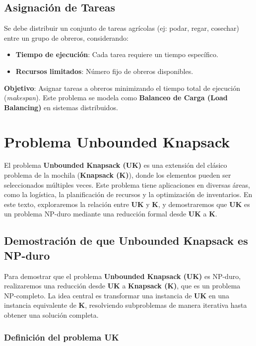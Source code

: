 \documentclass{report}
\begin{document}
	\section{Asignación de Tareas}
	Se debe distribuir un conjunto de tareas agrícolas (ej: podar, regar, cosechar) entre un grupo de obreros, considerando:
	\begin{itemize}
		\item \textbf{Tiempo de ejecución}: Cada tarea requiere un tiempo específico.
		\item \textbf{Recursos limitados}: Número fijo de obreros disponibles.
	\end{itemize}
	
	\textbf{Objetivo}: Asignar tareas a obreros minimizando el tiempo total de ejecución (\textit{makespan}). Este problema se modela como \textbf{Balanceo de Carga (Load Balancing)} en sistemas distribuidos.
	
	
	\chapter{Problema Unbounded Knapsack}
El problema \textbf{Unbounded Knapsack (UK)} es una extensión del clásico problema de la mochila (\textbf{Knapsack (K)}), donde los elementos pueden ser seleccionados múltiples veces. Este problema tiene aplicaciones en diversas áreas, como la logística, la planificación de recursos y la optimización de inventarios. En este texto, exploraremos la relación entre \textbf{UK} y \textbf{K}, y demostraremos que \textbf{UK} es un problema NP-duro mediante una reducción formal desde \textbf{UK} a \textbf{K}.

\section{Demostración de que Unbounded Knapsack es NP-duro}

Para demostrar que el problema \textbf{Unbounded Knapsack (UK)} es NP-duro, realizaremos una reducción desde \textbf{UK} a \textbf{Knapsack (K)}, que es un problema NP-completo. La idea central es transformar una instancia de \textbf{UK} en una instancia equivalente de \textbf{K}, resolviendo subproblemas de manera iterativa hasta obtener una solución completa.

\subsection*{Definición del problema UK}
\end{document}
